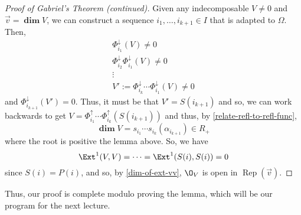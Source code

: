 \documentclass[11pt,leqno,oneside]{amsbook}
\numberwithin{thm}{section}
\newcommand{\Rep}{\operatorname{Rep}} %
\newcommand{\grdim}{\boldsymbol{\dim}} %
\newcommand{\sinktosourcefunc}{\Phi^\downarrow} %
\newcommand{\sourcetosinkfunc}{\Phi^\uparrow} %
\renewcommand{\roots}{R} %
\begin{document}
\begin{proof}[Proof of Gabriel's Theorem (continued)]
  Given any indecomposable \(V \neq 0\) and \(\vec{v} = \grdim V\), we
  can construct a sequence \(i_1, \ldots, i_{k+1} \in I\) that is
  adapted to \(\Omega\). Then,
  \begin{align*}
    \sinktosourcefunc_{i_1}(V) \neq 0 \\
    \sinktosourcefunc_{i_2}\sinktosourcefunc_{i_1}(V) \neq 0 \\
    \vdots\\
    V' := \sinktosourcefunc_{i_k} \cdots \sinktosourcefunc_{i_1}(V) \neq 0
  \end{align*}
  and \(\sinktosourcefunc_{i_{k+1}}(V') = 0\). Thus, it must be that
  \(V' = S(i_{k+1})\) and so, we can work backwards to get \(V =
  \sourcetosinkfunc_{i_1} \cdots \sourcetosinkfunc_{i_k}(S(i_{k+1}))\)
  and thus, by \ref{relate-refl-to-refl-func}, \[
    \grdim V = s_{i_1} \cdots s_{i_k}(\alpha_{i_{k+1}}) \in \roots_+
  \]
  where the root is positive the lemma above. So, we have \[
    \Ext^1(V,V) = \cdots = \Ext^1(S(i),S(i)) = 0
  \]
  since \(S(i) = P(i)\), and so, by \ref{dim-of-ext-vv}, \(\O_V\) is open
  in \(\Rep(\vec{v})\). 
\end{proof}
Thus, our proof is complete modulo proving the lemma, which will be
our program for the next lecture.
\end{document}
